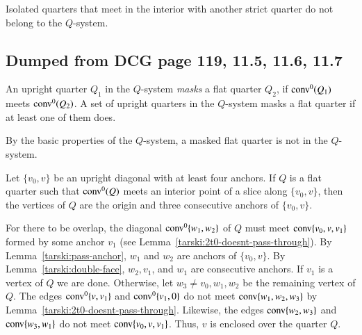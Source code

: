 \begin{tarskidata}
\begin{tarski}
Isolated quarters that meet in the interior with another strict
quarter do not belong to the $Q$-system.
\end{tarski}








\begin{tarski}
\section{Dumped from DCG page 119, 11.5, 11.6, 11.7}
\begin{definition}[mask]
An upright quarter $Q_1$ in the $Q$-system
{\it masks} a flat quarter $Q_2$, if
${\operatorname{conv}}^0(Q_1)$ meets ${\operatorname{conv}}^0(Q_2)$.   A set of upright
quarters in the $Q$-system masks a flat quarter if at least 
one of them does.
\end{definition}

By the basic properties of the $Q$-system, a masked flat quarter is
not in the $Q$-system.
\end{tarski}


\begin{tarski}

\begin{lemma}
Let $\{v_0,v\}$ be an upright diagonal with at least four anchors.
If $Q$ is a flat quarter such that ${\operatorname{conv}}^0(Q)$  meets  
an interior point of 
a slice along $\{v_0,v\}$, then the vertices of $Q$ are the
origin and three consecutive anchors of $\{v_0,v\}$.
\end{lemma}

\begin{proved}
For there to be overlap, the diagonal ${\operatorname{conv}}^0\{w_1,w_2\}$ of $Q$ 
must meet
 ${\operatorname{conv}}\{v_0,v,v_1\}$ formed by some anchor $v_1$  (see
Lemma~\ref{tarski:2t0-doesnt-pass-through}).  By
Lemma~\ref{tarski:pass-anchor}, $w_1$ and $w_2$ are anchors of
$\{v_0,v\}$. By Lemma~\ref{tarski:double-face}, $w_2,v_1$, and $w_1$
are consecutive anchors. If $v_1$ is a vertex of $Q$ we are done.
Otherwise, let $w_3\ne v_0,w_1,w_2$ be the remaining vertex of $Q$.
The edges ${\operatorname{conv}}^0\{v,v_1\}$ and ${\operatorname{conv}}^0\{v_1,0\}$ do not
meet
${\operatorname{conv}}\{w_1,w_2,w_3\}$ by Lemma~\ref{tarski:2t0-doesnt-pass-through}.
Likewise, the edges ${\operatorname{conv}}\{w_2,w_3\}$ and ${\operatorname{conv}}\{w_3,w_1\}$ 
do not meet
 ${\operatorname{conv}}\{v_0,v,v_1\}$. Thus, $v$ is enclosed over the
quarter $Q$.


\end{proved}
\end{tarski}
\end{tarskidata}
